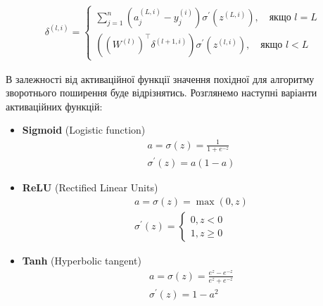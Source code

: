 \documentclass[14pt,a4paper]{extarticle}
\newcounter{e}
\numberwithin{equation}{section}
\numberwithin{figure}{section}
\newcommand{\ith}{^{(i)}}
\begin{document}
	\begin{equation*}
		\begin{array}{l}
		\displaystyle
			\delta^{(l, i)}
			=
			\left\{
			\begin{array}{l}
				\displaystyle
				\sum_{j=1}^{n}{ \left(a^{(L, i)}_j - y\ith_j\right)} \sigma^{\prime}(z^{(L, i)}), \quad \text{якщо } l = L
				\\[0.7cm]
				
				\displaystyle
				\left((W^{(l)})^{\top} \delta^{(l+1, i)} \right) \sigma^{\prime} (z^{(l, i)}), \quad \text{якщо } l < L
			\end{array}\right.
		\end{array}
	\end{equation*}

	В залежності від активаційної функції значення похідної для алгоритму зворотнього поширення буде відрізнятись. Розглянемо наступні варіанти активаційних функцій:	
	\begin{itemize}	
		\item \textbf{Sigmoid} (Logistic function)
		\label{sigmoid}
		\begin{equation}
			\begin{array}{l}
				\displaystyle
				a=\sigma(z)=\frac{1}{1+e^{-z}} \\[0.5cm]

				\displaystyle
				\sigma^{\prime}(z)=a(1-a)
			\end{array}
		\end{equation}
		
		\item \textbf{ReLU} (Rectiﬁed Linear Units)
		\begin{equation}
			\label{relu}
			\begin{array}{l}
				\displaystyle
				a=\sigma(z)=\max (0, z) \\[0.5cm]

				\displaystyle
				\sigma^{\prime}(z)=\left\{\begin{array}{l}
					0, z<0 \\
					1, z \geq 0
				\end{array}\right.
			\end{array}
		\end{equation}
		
		\item \textbf{Tanh} (Hyperbolic tangent)
		\begin{equation}
			\label{tanh}
			\begin{array}{l}
				\displaystyle
				a=\sigma(z)=\frac{e^{z}-e^{-z}}{e^{z}+e^{-z}} \\[0.5cm]

				\displaystyle
				\sigma^{\prime}(z)=1-a^{2}
			\end{array}
		\end{equation}
	\end{itemize}
	
\end{document}
